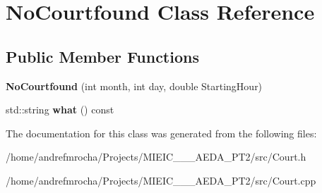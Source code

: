 \hypertarget{class_no_courtfound}{}\section{No\+Courtfound Class Reference}
\label{class_no_courtfound}
\subsection*{Public Member Functions}
\begin{DoxyCompactItemize}
\item 
\mbox{\label{class_no_courtfound_a5e23a986b5c59d782cf0148f29045896}} 
{\bfseries No\+Courtfound} (int month, int day, double Starting\+Hour)
\item 
\mbox{\label{class_no_courtfound_a338fab6e854c1c99a6268d18d605bd4b}} 
std\+::string {\bfseries what} () const
\end{DoxyCompactItemize}


The documentation for this class was generated from the following files\+:\begin{DoxyCompactItemize}
\item 
/home/andrefmrocha/\+Projects/\+M\+I\+E\+I\+C\+\_\+\_\+\_\+\+A\+E\+D\+A\+\_\+\+P\+T2/src/Court.\+h\item 
/home/andrefmrocha/\+Projects/\+M\+I\+E\+I\+C\+\_\+\_\+\_\+\+A\+E\+D\+A\+\_\+\+P\+T2/src/Court.\+cpp\end{DoxyCompactItemize}
